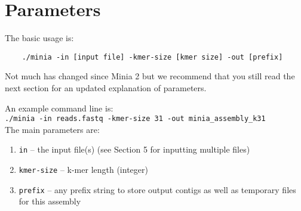 \documentclass[a4paper]{article}
\begin{document}
\section{Parameters}

The basic usage is:\\

\begin{verbatim}
    ./minia -in [input file] -kmer-size [kmer size] -out [prefix]
\end{verbatim}

Not much has changed since Minia 2 but we recommend that you still read the next section for an updated explanation of parameters.

An example command line is:\\


\verb+./minia -in reads.fastq -kmer-size 31 -out minia_assembly_k31+\\

The main parameters are:

\begin{enumerate}

    \item \verb+in+ -- the input file(s) (see Section 5 for inputting multiple files)

    \item \verb+kmer-size+  -- k-mer length (integer)

\item \verb+prefix+ -- any prefix string to store output contigs as well as temporary files for this assembly

\end{enumerate}
\end{document}
